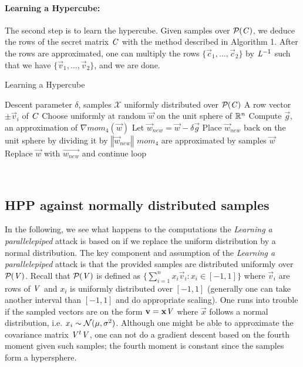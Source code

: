 \paragraph{Learning a Hypercube:}
The second step is to learn the hypercube. Given samples over $\mathcal{P}_{}(\mathit{C})$, we deduce the rows of the secret matrix $\mathit{C}$ with the method described in Algorithm 1. After the rows are approximated,
one can multiply the rows $\{\vec{c}_1, ..., \vec{c}_2\}$ by $\mathit{L}^{-1}$ such that we have $\{\vec{v}_1, ..., \vec{v}_2\}$, and we are done.
\begin{algorithm}
    \caption{Learning a Hypercube}
    \begin{algorithmic}
        \Require Descent parameter $\delta$, samples $\mathcal{X}$ uniformly distributed over $\mathcal{P}_{}(\mathit{C})$
        \Ensure A row vector $\pm \vec{v}_i$ of $\mathit{C}$
        \State Choose uniformly at random $\vec{w}$ on the unit sphere of $\mathbb{R}^n$
        \Loop
        \State Compute $\vec{g}$, an approximation of $\nabla mom_{4}(\vec{w})$
        \State Let $\vec{w}_{new} = \vec{w} - \delta \vec{g}$
        \State Place $\vec{w}_{new}$ back on the unit sphere by dividing it by $\left \Vert \vec{w}_{new} \right \Vert$
         \Comment $mom_4$ are approximated by samples 
            \State \Return $\vec{w}$
        \Else
            \State Replace $\vec{w}$ with $\vec{w_{new}}$ and continue loop
        \EndIf
        \EndLoop
    \end{algorithmic}
\end{algorithm}
\hfill \break \\

\subsection{HPP against normally distributed samples}
In the following, we see what happens to the computations the \textit{Learning a parallelepiped} attack is based on if we replace the uniform distribution by a normal distribution.
The key component and assumption of the \textit{Learning a parallelepiped} attack is that the provided samples are distributed uniformly over $\mathcal{P}_{}(\mathit{V})$.
Recall that $\mathcal{P}_{}(\mathit{V})$ is defined as $\{\sum_{i=1}^n x_i \vec{v}_i : x_i \in [-1, 1]\}$ where $\vec{v}_i$ are rows of $\mathit{V}$ and $x_i$ is uniformly distributed over $[-1, 1]$ 
(generally one can take another interval than $[-1, 1]$ and do appropriate scaling).
One runs into trouble if the sampled vectors are on the form $\mathbf{v} = \mathbf{x} \mathit{V}$ where $\vec{x}$ follows a normal distribution, i.e. $x_i \sim \mathcal{N}(\mu, \sigma^2)$.
Although one might be able to approximate the covariance matrix $\mathit{V}^t \mathit{V}$, one can not do a gradient descent based on the fourth moment given such samples; the fourth moment is constant since the samples form a hypersphere.


